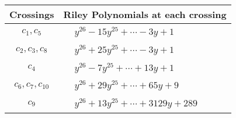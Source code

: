 \documentclass[1p]{elsarticle_modified}
\theoremstyle{definition}
\begin{document}
\begin{tabular}{m{50pt}|m{274pt}}
Crossings & \hspace{64pt}Riley Polynomials at each crossing \\
\hline $$\begin{aligned}c_{1},c_{5}\end{aligned}$$&$\begin{aligned}
&y^{26}-15 y^{25}+\cdots-3 y+1
\end{aligned}$\\
\hline $$\begin{aligned}c_{2},c_{3},c_{8}\end{aligned}$$&$\begin{aligned}
&y^{26}+25 y^{25}+\cdots-3 y+1
\end{aligned}$\\
\hline $$\begin{aligned}c_{4}\end{aligned}$$&$\begin{aligned}
&y^{26}-7 y^{25}+\cdots+13 y+1
\end{aligned}$\\
\hline $$\begin{aligned}c_{6},c_{7},c_{10}\end{aligned}$$&$\begin{aligned}
&y^{26}+29 y^{25}+\cdots+65 y+9
\end{aligned}$\\
\hline $$\begin{aligned}c_{9}\end{aligned}$$&$\begin{aligned}
&y^{26}+13 y^{25}+\cdots+3129 y+289
\end{aligned}$\\
\hline
\end{tabular}
\vskip 2pc
\end{document}
